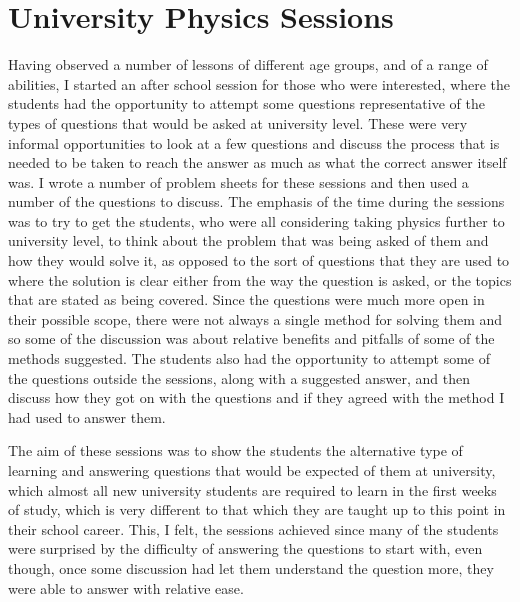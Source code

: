 \section{University Physics Sessions} %
\label{sec:university_physics_sessions}
	Having observed a number of lessons of different age groups, and of a range of abilities, I started an after school session for those who were interested, where the students had the opportunity to attempt some questions representative of the types of questions that would be asked at university level. These were very informal opportunities to look at a few questions and discuss the process that is needed to be taken to reach the answer as much as what the correct answer itself was. I wrote a number of problem sheets for these sessions and then used a number of the questions to discuss. The emphasis of the time during the sessions was to try to get the students, who were all considering taking physics further to university level, to think about the problem that was being asked of them and how they would solve it, as opposed to the sort of questions that they are used to where the solution is clear either from the way the question is asked, or the topics that are stated as being covered. Since the questions were much more open in their possible scope, there were not always a single method for solving them and so some of the discussion was about relative benefits and pitfalls of some of the methods suggested. The students also had the opportunity to attempt some of the questions outside the sessions, along with a suggested answer, and then discuss how they got on with the questions and if they agreed with the method I had used to answer them.

	The aim of these sessions was to show the students the alternative type of learning and answering questions that would be expected of them at university, which almost all new university students are required to learn in the first weeks of study, which is very different to that which they are taught up to this point in their school career. This, I felt, the sessions achieved since many of the students were surprised by the difficulty of answering the questions to start with, even though, once some discussion had let them understand the question more, they were able to answer with relative ease.
